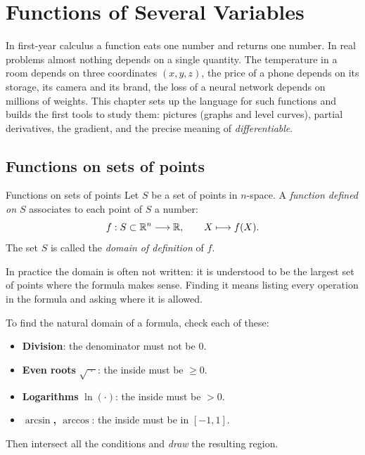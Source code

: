 \renewcommand{\tabname}{I}
\chapter{Functions of Several Variables}

In first-year calculus a function eats one number and returns one number. In real
problems almost nothing depends on a single quantity. The temperature in a room depends
on three coordinates $(x,y,z)$, the price of a phone depends on its storage, its camera
and its brand, the loss of a neural network depends on millions of weights. This chapter
sets up the language for such functions and builds the first tools to study them:
pictures (graphs and level curves), partial derivatives, the gradient, and the precise
meaning of \emph{differentiable}.

\section{Functions on sets of points}


\begin{definition}{Functions on sets of points}
Let $S$ be a set of points in $n$-space. A \emph{function defined on $S$} associates to
each point of $S$ a number:
\[
 f : S\subset \mathbb{R}^n \longrightarrow \mathbb{R}, \qquad X\longmapsto f(X).
\]
The set $S$ is called the \emph{domain of definition} of $f$.
\end{definition}

In practice the domain is often not written: it is understood to be the largest set of
points where the formula makes sense. Finding it means listing every operation in the
formula and asking where it is allowed.

\begin{recipe}
To find the natural domain of a formula, check each of these:
\begin{itemize}
  \item \textbf{Division}: the denominator must not be $0$.
  \item \textbf{Even roots} $\sqrt{\;\cdot\;}$: the inside must be $\ge 0$.
  \item \textbf{Logarithms} $\ln(\cdot)$: the inside must be $>0$.
  \item \textbf{$\arcsin$, $\arccos$}: the inside must be in $[-1,1]$.
\end{itemize}
Then intersect all the conditions and \emph{draw} the resulting region.
\end{recipe}


